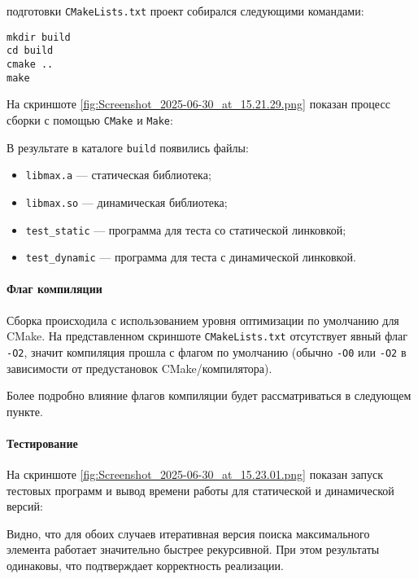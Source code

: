 \vspace{0.5em}
 подготовки \texttt{CMakeLists.txt} проект собирался следующими командами:
\begin{lstlisting}
mkdir build
cd build
cmake ..
make
\end{lstlisting}
На скриншоте \ref{fig:Screenshot_2025-06-30_at_15.21.29.png} показан процесс сборки с помощью \texttt{CMake} и \texttt{Make}:


\vspace{0.5em}
В результате в каталоге \texttt{build} появились файлы:
\begin{itemize}
\item \texttt{libmax.a} — статическая библиотека;
\item \texttt{libmax.so} — динамическая библиотека;
\item \texttt{test\_static} — программа для теста со статической линковкой;
\item \texttt{test\_dynamic} — программа для теста с динамической линковкой.
\end{itemize}

\paragraph{Флаг компиляции}
Сборка происходила с использованием уровня оптимизации по умолчанию для CMake. На представленном скриншоте \texttt{CMakeLists.txt} отсутствует явный флаг \texttt{-O2}, значит компиляция прошла с флагом по умолчанию (обычно \texttt{-O0} или \texttt{-O2} в зависимости от предустановок CMake/компилятора).

Более подробно влияние флагов компиляции будет рассматриваться в следующем пункте.

\vspace{0.5em}
\paragraph{Тестирование}
На скриншоте \ref{fig:Screenshot_2025-06-30_at_15.23.01.png} показан запуск тестовых программ и вывод времени работы для статической и динамической версий:


Видно, что для обоих случаев итеративная версия поиска максимального элемента работает значительно быстрее рекурсивной. При этом результаты одинаковы, что подтверждает корректность реализации.

